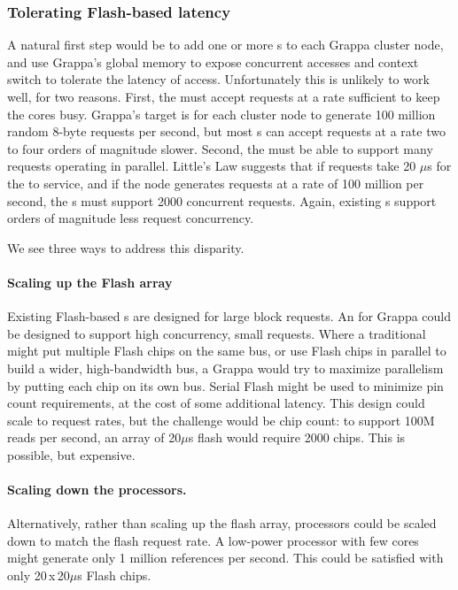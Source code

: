 \subsubsection{Tolerating Flash-based  latency} 
A natural first step would be to add one or more s to each Grappa
cluster node, and use Grappa's global memory  to expose concurrent
accesses and context switch to tolerate the latency of 
access. Unfortunately this is unlikely to work well, for two
reasons. First, the  must accept requests at a rate sufficient to
keep the cores busy. Grappa's target is for each cluster node to
generate 100 million random 8-byte requests per second, but most s
can accept requests at a rate two to four orders of magnitude slower.
Second, the  must be able to support many requests operating in
parallel. Little's Law suggests that if requests take 20 $\mu$s for
the  to service, and if the node generates requests at a rate of
100 million per second, the s must support 2000 concurrent
requests. Again, existing s support orders of magnitude less request concurrency.

We see three ways to address this disparity.
\paragraph{Scaling up the Flash array}
Existing Flash-based s are designed for large block requests. An
 for Grappa could be designed to support high concurrency, small
requests. Where a traditional  might put multiple Flash chips on
the same bus, or use Flash chips in parallel to build a wider,
high-bandwidth bus, a Grappa  would try to maximize parallelism by
putting each chip on its own bus. Serial Flash might be used to
minimize pin count requirements, at the cost of some additional
latency. This design could scale to request rates, but the challenge
would be chip count: to support 100M reads per second, an array of
20$\mu$s flash would require 2000 chips. This is possible, but expensive.

\paragraph{Scaling down the processors.}
Alternatively, rather than scaling up the flash array, processors
could be scaled down to match the flash request rate. A low-power
processor with few cores might generate only 1 million references per
second. This could be satisfied with only 20\,x\,20$\mu$s Flash chips.

